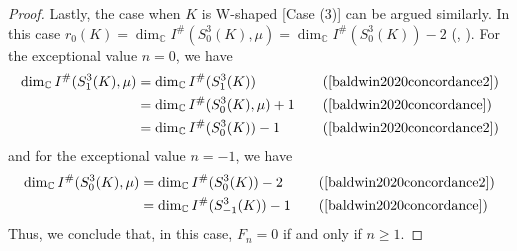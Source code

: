 \documentclass[11pt]{amsart}
\begin{document}
\begin{proof}
	Lastly, the case when $K$ is W-shaped [Case (3)]  can be argued similarly. In this case $r_0(K)= \dim_{\mathbb{C}}I^{\#}(S^3_{0}(K),\mu)=\dim_{\mathbb{C}}I^{\#}(S^3_{0}(K))-2$ (\cite[Definition 3.6]{baldwin2020concordance}, \cite[Theorem 1.13]{baldwin2020concordance2}). For the exceptional value $n=0$, we have  
\[
		\begin{aligned}
			\dim_{\mathbb{C}}I^{\#}(S^3_{1}(K),\mu)&=\dim_{\mathbb{C}}I^{\#}(S^3_{1}(K)) &&\quad\text{(\cite[Theorem 1.12]{baldwin2020concordance2})}\\
			&= \dim_{\mathbb{C}}I^{\#}(S^3_{0}(K),\mu) + 1 &&\quad\text{(\cite[Theorem 3.7]{baldwin2020concordance})}\\
			&= \dim_{\mathbb{C}}I^{\#}(S^3_{0}(K)) - 1 &&\quad\text{(\cite[Theorem 1.13]{baldwin2020concordance2})}
		\end{aligned}
	\]	
and for the exceptional value $n=-1$, we have
	\[
		\begin{aligned}
			\dim_{\mathbb{C}}I^{\#}(S^3_{0}(K),\mu) &= \dim_{\mathbb{C}}I^{\#}(S^3_{0}(K)) - 2 &&\quad\text{(\cite[Theorem 1.13]{baldwin2020concordance2})}\\
			&= \dim_{\mathbb{C}}I^{\#}(S^3_{-1}(K)) - 1 &&\quad\text{(\cite[Theorem 3.7]{baldwin2020concordance})}
		\end{aligned}
	\]
	Thus, we conclude that, in this case, $F_n=0$ if and only if $n\geq 1$.
	
	
\end{proof}
\end{document}
